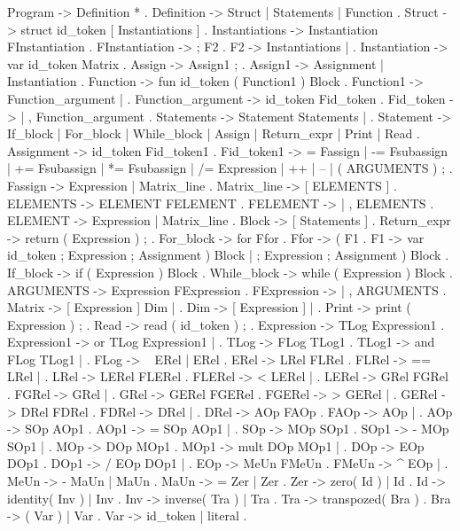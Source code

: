 Program ->   Definition * .
Definition ->    Struct |   Statements |   Function .
Struct ->    struct id_token [ Instantiations ] .
Instantiations -> Instantiation FInstantiation .
FInstantiation -> ; F2 .
F2 -> Instantiations | \lambda.
Instantiation -> var id_token Matrix .
Assign ->    Assign1 ; .
Assign1 ->   Assignment |   Instantiation .
Function ->  fun id_token ( Function1 ) Block .
Function1 -> Function_argument |   \lambda .
Function_argument -> id_token Fid_token .
Fid_token -> \lambda |   , Function_argument .
Statements -> Statement Statements | \lambda .
Statement -> If_block | For_block |   While_block |   Assign |   Return_expr |   Print |   Read .
Assignment ->    id_token Fid_token1 .
Fid_token1 ->    = Fassign |   -= Fsubassign |   += Fsubassign |   *= Fsubassign |   /= Expression |   ++ |   -- | ( ARGUMENTS ) ; .
Fassign ->   Expression |   Matrix_line .
Matrix_line ->   [ ELEMENTS ] .
ELEMENTS ->  ELEMENT FELEMENT .
FELEMENT ->  \lambda |   , ELEMENTS .
ELEMENT ->   Expression |   Matrix_line .
Block -> [ Statements ] .
Return_expr ->   return ( Expression ) ; .
For_block -> for Ffor .
Ffor ->  ( F1 .
F1 ->    var id_token ; Expression ; Assignment ) Block |   \lambda ; Expression ; Assignment ) Block .
If_block ->  if ( Expression ) Block .
While_block ->   while ( Expression ) Block .
ARGUMENTS -> Expression FExpression .
FExpression -> \lambda |   , ARGUMENTS .
Matrix ->    [ Expression ] Dim | \lambda.
Dim ->   [ Expression ] |   \lambda .
Print -> print ( Expression ) ; .
Read ->  read ( id_token ) ; .
Expression ->    TLog Expression1 .
Expression1 ->   or TLog Expression1 | \lambda    .
TLog ->  FLog TLog1 .
TLog1 -> and FLog TLog1 | \lambda    .
FLog ->  ~ ERel |   ERel .
ERel ->  LRel FLRel .
FLRel -> == LRel | \lambda    .
LRel ->  LERel FLERel .
FLERel ->    < LERel | \lambda    .
LERel -> GRel FGRel .
FGRel -> \leq GRel | \lambda    .
GRel ->  GERel FGERel .
FGERel ->    > GERel | \lambda    .
GERel -> DRel FDRel .
FDRel -> \geq DRel | \lambda    .
DRel ->  AOp FAOp .
FAOp ->  \neq AOp | \lambda    .
AOp ->   SOp AOp1 .
AOp1 ->  = SOp AOp1 | \lambda    .
SOp ->   MOp SOp1 .
SOp1 ->  - MOp SOp1 | \lambda    .
MOp ->   DOp MOp1 .
MOp1 ->  mult DOp MOp1 | \lambda    .
DOp ->   EOp DOp1 .
DOp1 ->  / EOp DOp1 | \lambda    .
EOp ->   MeUn FMeUn .
FMeUn -> ^ EOp | \lambda    .
MeUn ->  - MaUn |   MaUn .
MaUn ->  = Zer |   Zer .
Zer ->   zero( Id ) |   Id .
Id ->    identity( Inv ) |   Inv .
Inv ->   inverse( Tra ) |   Tra .
Tra ->   transpozed( Bra ) .
Bra ->   ( Var ) | Var .
Var ->   id_token | literal .